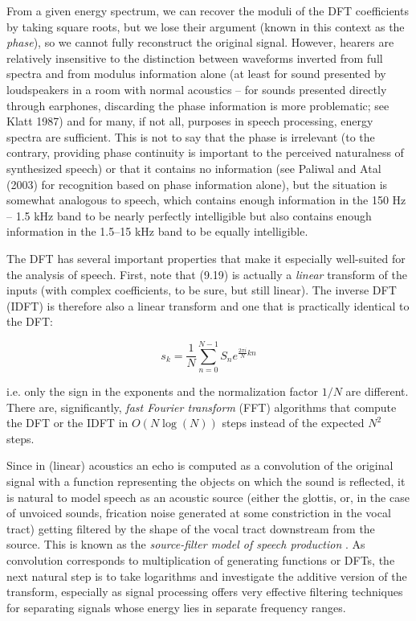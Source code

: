From a given energy spectrum, we can recover the moduli of the DFT
coefficients by taking square roots, but we lose their argument (known in this
context as the {\it phase}), so we cannot fully reconstruct the original
signal. However, hearers are relatively insensitive to the distinction between
waveforms inverted from full spectra and from modulus information
alone (at least for sound presented by loudspeakers in a room with normal
acoustics -- for sounds presented directly through earphones, discarding the
phase information is more problematic; see Klatt 1987)\nocite{Klatt:1987} and
for many, if not all, purposes in speech processing, energy spectra are
sufficient. This is not to say that the phase is irrelevant (to the contrary,
providing phase continuity is important to the perceived naturalness of
synthesized speech) or that it contains no information (see Paliwal and Atal
(2003) for recognition based on phase information alone), but the situation is
somewhat analogous to speech, which contains enough information in the 150 Hz
-- 1.5 kHz band to be nearly perfectly intelligible but also contains enough
information in the 1.5--15 kHz band to be equally
intelligible.\nocite{Paliwal:2003}

The DFT has several important properties that make it especially well-suited
for the analysis of speech. First, note that (9.19) is actually a {\it linear}
transform of the inputs (with complex coefficients, to be sure, but still
linear). The inverse DFT (IDFT) is therefore also a linear transform and one
that is practically identical to the DFT:

\begin{equation}
s_k=\frac{1}{N}\sum_{n=0}^{N-1}S_ne^{\frac{2\pi i}{N} kn}
\end{equation}

\noindent
i.e. only the sign in the exponents and the normalization factor $1/N$ are
different. There are, significantly, {\it fast Fourier transform} (FFT)
 algorithms that compute the DFT or the
IDFT in $O(N\log(N))$ steps instead of the expected $N^2$ steps.

Since in (linear) acoustics an echo is computed as a convolution of the
original signal with a function representing the objects on which the sound is
reflected, it is natural to model speech as an acoustic source (either the
glottis, or, in the case of unvoiced sounds, frication noise generated at some
constriction in the vocal tract) getting filtered by the shape of the vocal
tract downstream from the source. This is known as the {\it source-filter
  model of speech production} \cite{Fant:1960}. As
convolution corresponds to multiplication of generating functions or DFTs, the
next natural step is to take logarithms and investigate the additive version
of the transform, especially as signal processing offers very effective
filtering techniques for separating signals whose energy lies in separate
frequency ranges.

